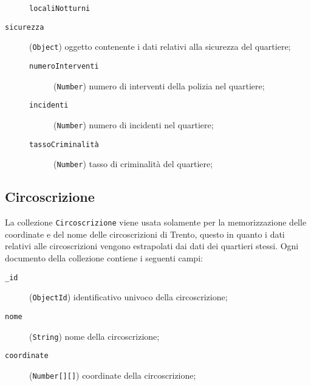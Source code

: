 \begin{description}
\begin{description}
                    \item[\texttt{localiNotturni}]
                \end{description}
            \item[\texttt{sicurezza}] (\texttt{Object}) oggetto contenente i dati relativi alla sicurezza del quartiere;
                \begin{description}
                    \item[\texttt{numeroInterventi}] (\texttt{Number}) numero di interventi della polizia nel quartiere;
                    \item[\texttt{incidenti}] (\texttt{Number}) numero di incidenti nel quartiere;
                    \item[\texttt{tassoCriminalità}] (\texttt{Number}) tasso di criminalità del quartiere;
                \end{description}
        \end{description}
    \subsection{Circoscrizione}
        La collezione \texttt{Circoscrizione} viene usata solamente per la memorizzazione delle coordinate e del nome delle circoscrizioni di Trento, questo in quanto i dati relativi alle circoscrizioni vengono estrapolati dai dati dei quartieri stessi. Ogni documento della collezione contiene i seguenti campi:
        \begin{description}
            \item[\texttt{\_id}] (\texttt{ObjectId}) identificativo univoco della circoscrizione;
            \item[\texttt{nome}] (\texttt{String}) nome della circoscrizione;
            \item[\texttt{coordinate}] (\texttt{Number[][]}) coordinate della circoscrizione;
        \end{description}
